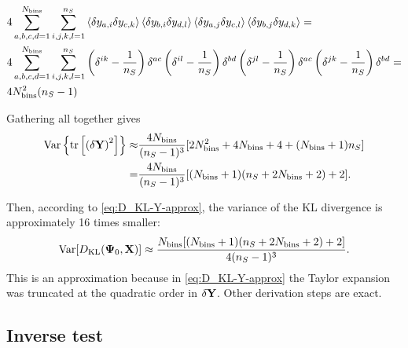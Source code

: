 \begin{align}
& 4 \sum_{a,b,c,d=1}^{N_{\rm bins}} \sum_{i,j,k,l=1}^{n_S} \left\langle \delta y_{a,i} \delta y_{c,k} \right\rangle \left\langle \delta y_{b,i} \delta y_{d,l} \right\rangle \left\langle \delta y_{a,j} \delta y_{c,l} \right\rangle \left\langle \delta y_{b,j} \delta y_{d,k} \right\rangle = \nonumber \\
& 4 \sum_{a,b,c,d=1}^{N_{\rm bins}} \sum_{i,j,k,l=1}^{n_S} \left( \delta^{ik} - \frac1{n_S} \right) \delta^{ac} \left( \delta^{il} - \frac1{n_S} \right) \delta^{bd} \left( \delta^{jl} - \frac1{n_S} \right) \delta^{ac} \left( \delta^{jk} - \frac1{n_S} \right) \delta^{bd} = \nonumber \\
& 4 N_{\rm bins}^2 (n_S-1)
\end{align}

Gathering all together gives
\begin{align} \label{eq:Var-tr-deltaY2}
\Var \Argf{\tr \Args{\Arg{\bf \delta Y}^2}} \approx
& \frac{4 N_{\rm bins}}{(n_S-1)^3} [2 N_{\rm bins}^2 + 4 N_{\rm bins} + 4 + (N_{\rm bins} + 1) n_S] \nonumber \\
=& \frac{4 N_{\rm bins}}{(n_S-1)^3} [(N_{\rm bins} + 1) (n_S + 2 N_{\rm bins} + 2) + 2].
\end{align}

Then, according to \cref{eq:D_KL-Y-approx}, the variance of the KL divergence is approximately 16 times smaller:
\begin{equation} \label{eq:D_KL-variance}
\operatorname{Var} [D_{\rm KL} {\left( {\bf \Psi}_0, {\bf X} \right)}] \approx \frac{N_{\rm bins} [(N_{\rm bins} + 1) (n_S + 2 N_{\rm bins} + 2) + 2]}{4(n_S-1)^3}.
\end{equation}
This is an approximation because in \cref{eq:D_KL-Y-approx} the Taylor expansion was truncated at the quadratic order in $\bf \delta Y$.
Other derivation steps are exact.

\subsection{Inverse test}
\label{subsec:inv-test}

